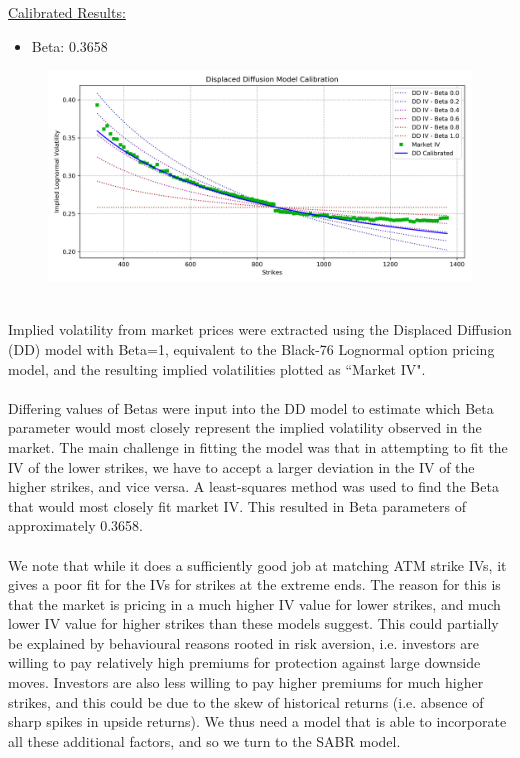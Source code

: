 \documentclass{article}
\begin{document}
\underline{Calibrated Results:}
\begin{itemize}
	\item Beta: 0.3658
\end{itemize}

\begin{figure}[ht]
	\centering
	\includegraphics[width= \linewidth]{DD.png}
\end{figure}
\noindent\\
Implied volatility from market prices were extracted using the Displaced Diffusion (DD) model with Beta=1, equivalent to the Black-76 Lognormal option pricing model, and the resulting implied volatilities plotted as ``Market IV".\\
\noindent\\
Differing values of Betas were input into the DD model to estimate which Beta parameter would most closely represent the implied volatility observed in the market. The main challenge in fitting the model was that in attempting to fit the IV of the lower strikes, we have to accept a larger deviation in the IV of the higher strikes, and vice versa. A least-squares method was used to find the Beta that would most closely fit market IV. This resulted in Beta parameters of approximately 0.3658.\\
\noindent\\
We note that while it does a sufficiently good job at matching ATM strike IVs, it gives a poor fit for the IVs for strikes at the extreme ends. The reason for this is that the market is pricing in a much higher IV value for lower strikes, and much lower IV value for higher strikes than these models suggest. This could partially be explained by behavioural reasons rooted in risk aversion, i.e. investors are willing to pay relatively high premiums for protection against large downside moves. Investors are also less willing to pay higher premiums for much higher strikes, and this could be due to the skew of historical returns (i.e. absence of sharp spikes in upside returns). We thus need a model that is able to incorporate all these additional factors, and so we turn to the SABR model. \\
\end{document}
